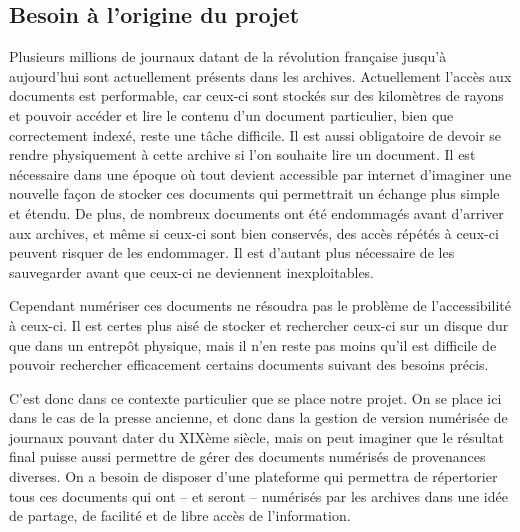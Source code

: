     \subsection{Besoin à l'origine du projet}
    \label{subsec:besoin}
    Plusieurs millions de journaux datant de la révolution française jusqu’à aujourd’hui sont
    actuellement présents dans les archives. Actuellement l’accès aux documents est performable,
    car ceux-ci sont stockés sur des kilomètres de rayons et pouvoir accéder et lire le contenu
    d’un document particulier, bien que correctement indexé, reste une tâche difficile.
    Il est aussi obligatoire de devoir se rendre physiquement à cette archive si l’on souhaite lire un document.
    Il est nécessaire dans une époque où tout devient accessible par internet d’imaginer une nouvelle
    façon de stocker ces documents qui permettrait un échange plus simple et étendu. De plus,
    de nombreux documents ont été endommagés avant d’arriver aux archives, et même si ceux-ci
    sont bien conservés, des accès répétés à ceux-ci peuvent risquer de les endommager. Il est d’autant
    plus nécessaire de les sauvegarder avant que ceux-ci ne deviennent inexploitables.

    Cependant numériser ces documents ne résoudra pas le problème de l’accessibilité à ceux-ci.
    Il est certes plus aisé de stocker et rechercher ceux-ci sur un disque dur que dans un entrepôt physique,
    mais il n’en reste pas moins qu’il est difficile de pouvoir rechercher efficacement certains documents suivant des besoins précis.

    C’est donc dans ce contexte particulier que se place notre projet. On se place ici dans
    le cas de la presse ancienne, et donc dans la gestion de version numérisée de journaux pouvant
    dater du XIXème siècle, mais on peut imaginer que le résultat final puisse aussi permettre de gérer
    des documents numérisés de provenances diverses. On a besoin de disposer d’une plateforme qui permettra
    de répertorier tous ces documents qui ont – et seront – numérisés par les archives dans une idée de partage,
    de facilité et de libre accès de l’information.
